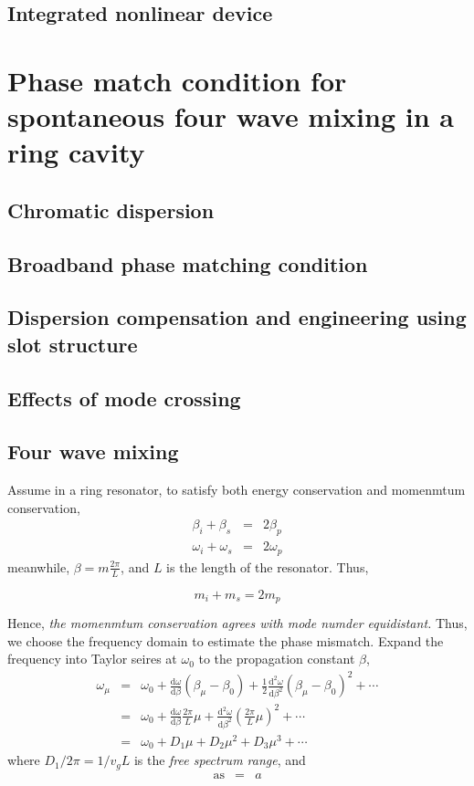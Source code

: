\documentclass[final]{kuee_en}
\newcommand{\mathd}{\mathrm{d}}
\newcommand{\tmname}[1]{\textsc{#1}}
\newcommand{\tmop}[1]{\ensuremath{\operatorname{#1}}}
\newcommand{\tmtextit}[1]{{\itshape{#1}}}
\begin{document}
\section{Integrated nonlinear device}

\chapter{Phase match condition for spontaneous four wave mixing in a ring cavity }
\section{Chromatic dispersion}

\section{Broadband phase matching condition}
\section{Dispersion compensation and engineering using slot structure}
\section{Effects of mode crossing}
\section{Four wave mixing}


Assume in a ring resonator, to satisfy both energy conservation and momenmtum
conservation,
\begin{eqnarray*}
  \beta_i + \beta_s & = & 2 \beta_p\\
  \omega_i + \omega_s & = & 2 \omega_p
\end{eqnarray*}
meanwhile, $\beta = m \frac{2 \pi}{L}$, and $L$ is the length of the
resonator. Thus,

{\tmname{\begin{equation}
  m_i + m_s = 2 m_p
\end{equation}}}

Hence, \tmtextit{the momenmtum conservation agrees with mode numder
equidistant.} Thus, we choose the frequency domain to estimate the phase
mismatch. Expand the frequency into Taylor seires at $\omega_0$ to the
propagation constant $\beta$,
\begin{eqnarray}
  \omega_{\mu} & = & \omega_0 + \frac{\mathd \omega}{\mathd \beta}
  (\beta_{\mu} - \beta_0) + \frac{1}{2}  \frac{\mathd^2 \omega}{\mathd
  \beta^2} (\beta_{\mu} - \beta_0)^2 + \cdots \\
  & = & \omega_0 + \frac{\mathd \omega}{\mathd \beta} \frac{2 \pi}{L} \mu +
  \frac{\mathd^2 \omega}{\mathd \beta^2} \left( \frac{2 \pi}{L} \mu \right)^2
  + \cdots \nonumber\\
  & = & \omega_0 + D_1 \mu + D_2 \mu^2 + D_3 \mu^3 + \cdots \nonumber
\end{eqnarray}
where $D_1 / 2 \pi = 1 / v_g L$ is the \tmtextit{free spectrum range}, and
\begin{eqnarray*}
  \tmop{as} & = & a
\end{eqnarray*}



\end{document}
